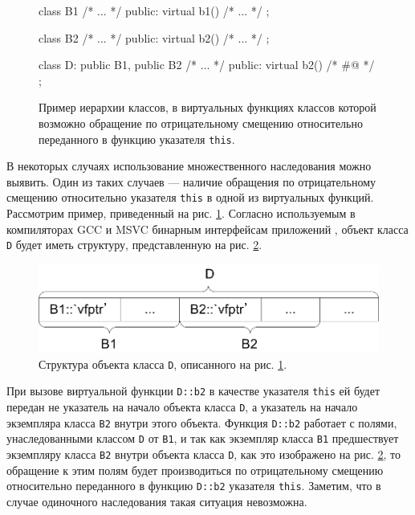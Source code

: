 \begin{figure}[htb!]
\hspace{2cm}
\begin{minipage}[b]{1cm}
\begin{cplusplus}
class B1 {
    /* ... */
public:
    virtual b1() {/* ... */}
};

class B2 {
    /* ... */
public:
    virtual b2() {/* ... */}
};

class D: public B1, public B2 {
    /* ... */
public:
    virtual b2() {/* #@ */}
};
\end{cplusplus}
\end{minipage}
\caption{Пример иерархии классов, в виртуальных функциях классов которой возможно обращение по отрицательному смещению относительно переданного в функцию указателя \lstinline{this}.}
\label{listing:negative_this_access}
\end{figure}

В некоторых случаях использование множественного наследования можно выявить. Один из таких случаев --- наличие обращения по отрицательному смещению относительно указателя \lstinline{this} в одной из виртуальных функций. Рассмотрим пример, приведенный на рис. \ref{listing:negative_this_access}. Согласно используемым в компиляторах GCC и MSVC бинарным интерфейсам приложений \cite{gray94, gccabi}, объект класса \lstinline{D} будет иметь структуру, представленную на рис. \ref{fig:class_layout}.

\begin{figure}[htb!]
\centering
\includegraphics[scale=1.0]{images/class_layout.png}
\caption{Структура объекта класса \lstinline{D}, описанного на рис. \ref{listing:negative_this_access}.}
\label{fig:class_layout}
\end{figure}

При вызове виртуальной функции \lstinline{D::b2} в качестве указателя \lstinline{this} ей будет передан не указатель на начало объекта класса \lstinline{D}, а указатель на начало экземпляра класса \lstinline{B2} внутри этого объекта. Функция \lstinline{D::b2} работает с полями, унаследованными классом \lstinline{D} от \lstinline{B1}, и так как экземпляр класса \lstinline{B1} предшествует экземпляру класса \lstinline{B2} внутри объекта класса \lstinline{D}, как это изображено на рис. \ref{fig:class_layout}, то обращение к этим полям будет производиться по отрицательному смещению относительно переданного в функцию \lstinline{D::b2} указателя \lstinline{this}. Заметим, что в случае одиночного наследования такая ситуация невозможна.

